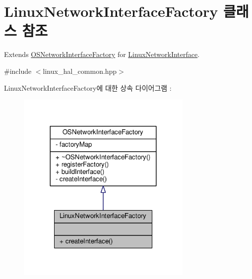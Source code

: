 \hypertarget{class_linux_network_interface_factory}{}\section{Linux\+Network\+Interface\+Factory 클래스 참조}
\label{class_linux_network_interface_factory}


Extends \hyperlink{class_o_s_network_interface_factory}{O\+S\+Network\+Interface\+Factory} for \hyperlink{class_linux_network_interface}{Linux\+Network\+Interface}.  




{\ttfamily \#include $<$linux\+\_\+hal\+\_\+common.\+hpp$>$}



Linux\+Network\+Interface\+Factory에 대한 상속 다이어그램 \+: 
\nopagebreak
\begin{figure}[H]
\begin{center}
\leavevmode
\includegraphics[width=240pt]{class_linux_network_interface_factory__inherit__graph}
\end{center}
\end{figure}


